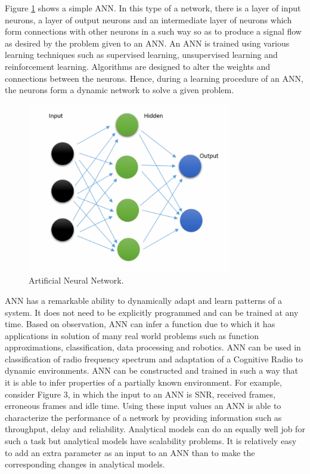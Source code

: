 \documentclass[conference]{IEEEtran}
\begin{document}
    Figure \ref{fig_ann} shows a simple ANN. In this type of a network, there is a layer of input neurons, a layer of output neurons and an intermediate layer of neurons which form connections with other neurons in a such way so as to produce a signal flow as desired by the problem given to an ANN. An ANN is trained using various learning techniques such as supervised learning, unsupervised learning and reinforcement learning. Algorithms are designed to alter the weights and connections between the neurons. Hence, during a learning procedure of an ANN, the neurons form a dynamic network to solve a given problem. 

\begin{figure}[!t]
\centering
\includegraphics[width=3.5in]{Figure_2}
\caption{Artificial Neural Network.}
\label{fig_ann}
\end{figure}
    
    ANN has a remarkable ability to dynamically adapt and learn patterns of a system. It does not need to be explicitly programmed and can be trained at any time. Based on observation, ANN can infer a function due to which it has applications in solution of many real world problems such as function approximations, classification, data processing and robotics. ANN can be used in classification of radio frequency spectrum and adaptation of a Cognitive Radio to dynamic environments. ANN can be constructed and trained in such a way that it is able to infer properties of a partially known environment. For example, consider Figure 3, in which the input to an ANN is SNR, received frames, erroneous frames and idle time. Using these input values an ANN is able to characterize the performance of a network by providing information such as throughput, delay and reliability. Analytical models can do an equally well job for such a task but analytical models have scalability problems. It is relatively easy to add an extra parameter as an input to an ANN than to make the corresponding changes in analytical models. 
\end{document}
